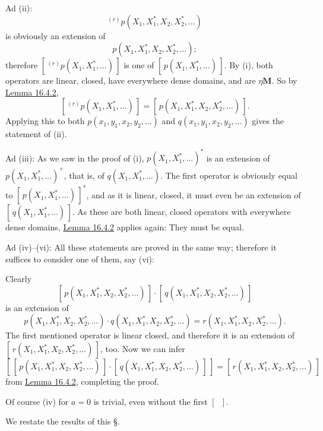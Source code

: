 \documentclass[12pt,b5paper,twoside]{article}
\newcommand{\M}{\mathbf M}
\newcommand{\clos}[1]{[\,#1\,]}
\newcommand{\lemref}[1]{\hyperref[lem:#1]{Lemma #1}}
\begin{document}
Ad (ii):
\[
{}^{(r)}p(X_1,X_1^*,X_2,X_2^*,\ldots)
\]
is obviously an extension of
\[
p(X_1,X_1^*,X_2,X_2^*,\ldots);
\]
therefore
\(\clos{{}^{(r)}p(X_1,X_1^*,\ldots)}\) is one of
\(\clos{p(X_1,X_1^*,\ldots)}\). By (i), both operators are linear, closed,
have everywhere dense domains, and are \(\mathbin\eta\M\). So by
\lemref{16.4.2},
\[
\clos{{}^{(r)}p(X_1,X_1^*,\ldots)}
=\clos{p(X_1,X_1^*,X_2,X_2^*,\ldots)}.
\]
Applying this to both \(p(x_1,y_1,x_2,y_2,\ldots)\) and
\(q(x_1,y_1,x_2,y_2,\ldots)\) gives the statement of (ii).

Ad (iii): As we saw in the proof of (i),
\(p(X_1,X_1^*,\ldots)^*\) is an extension of
\(p(X_1,X_1^*,\ldots)^+\), that is, of \(q(X_1,X_1^*,\ldots)\). The first
operator is obviously equal to \(\clos{p(X_1,X_1^*,\ldots)}^*\), and as it
is linear, closed, it must even be an extension of
\(\clos{q(X_1,X_1^*,\ldots)}\). As these are both linear, closed operators
with everywhere dense domains, \lemref{16.4.2} applies again: They must be
equal.

Ad (iv)--(vi): All these statements are proved in the same way; therefore it
suffices to consider one of them, say (vi):

Clearly
\[
\clos{p(X_1,X_1^*,X_2,X_2^*,\ldots)}\cdot
\clos{q(X_1,X_1^*,X_2,X_2^*,\ldots)}
\]
is an extension of
\[
p(X_1,X_1^*,X_2,X_2^*,\ldots)\cdot
q(X_1,X_1^*,X_2,X_2^*,\ldots)
=r(X_1,X_1^*,X_2,X_2^*,\ldots).
\]
The first mentioned operator is linear closed, and therefore it is an
extension of \(\clos{r(X_1,X_1^*,X_2,X_2^*,\ldots)}\), too. Now we can infer
\[
\clos{\clos{p(X_1,X_1^*,X_2,X_2^*,\ldots)}\cdot
      \clos{q(X_1,X_1^*,X_2,X_2^*,\ldots)}}
=\clos{r(X_1,X_1^*,X_2,X_2^*,\ldots)}
\]
from \lemref{16.4.2}, completing the proof.

Of course (iv) for \(a=0\) is trivial, even without the first
\(\clos{\ }\).

We restate the results of this \S.
\end{document}
